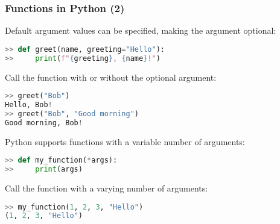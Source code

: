 \begin{frame}[fragile]
  \frametitle{Functions in Python (2)}
  Default argument values can be specified, making the argument optional:
  \begin{lstlisting}[language=Python, numbers=none]
>> def greet(name, greeting="Hello"):
>>     print(f"{greeting}, {name}!")
  \end{lstlisting}\pause
  Call the function with or without the optional argument:
  \begin{lstlisting}[language=Python, numbers=none]
>> greet("Bob")
Hello, Bob!
>> greet("Bob", "Good morning")
Good morning, Bob!
  \end{lstlisting}\pause
  Python supports functions with a variable number of arguments:
  \begin{lstlisting}[language=Python, numbers=none]
>> def my_function(*args):
>>     print(args)
  \end{lstlisting}\pause
  Call the function with a varying number of arguments:
  \begin{lstlisting}[language=Python, numbers=none]
>> my_function(1, 2, 3, "Hello")
(1, 2, 3, "Hello")
  \end{lstlisting}
\end{frame}


